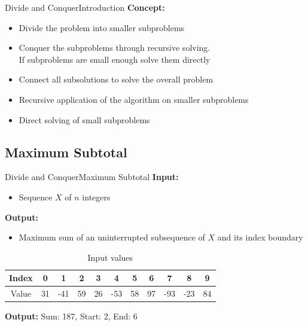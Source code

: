 


\begin{frame}{Divide and Conquer}{Introduction}
  \textbf{Concept:}
  \begin{itemize}
    \item<2->
      {\color{MainA}Divide} the problem into smaller subproblems
    \item<3->
      {\color{MainA}Conquer} the subproblems through recursive solving.\\
      If subproblems are small enough solve them directly
    \item<4->
      {\color{MainA}Connect} all subsolutions to solve the overall problem
    \item<5->
      {\color{MainA}Recursive} application of the algorithm on smaller
      subproblems
    \item<6->
      {\color{MainA}Direct} solving of small subproblems
  \end{itemize}
\end{frame}


\subsection{Maximum Subtotal}

\begin{frame}{Divide and Conquer}{Maximum Subtotal}
  \textbf{Input:}
  \begin{itemize}
    \item<2->
      Sequence {\color{MainA}$X$} of {\color{MainA}$n$} integers
  \end{itemize}
  \textbf{Output:}
  \begin{itemize}
    \item<3->
      Maximum sum of an uninterrupted subsequence of
      {\color{MainA}$X$} and its index boundary
  \end{itemize}
  \vspace{-1em}
  \begin{table}[!t]
    \caption{Input values}
    \begin{tabular}{c|c|c|c|c|c|c|c|c|c|c}
      Index & 0 & 1 & 2 & 3 & 4 & 5 & 6 & 7 & 8 & 9\\
      \midrule
      Value & 31 & -41 & 59 & 26 & -53 & 58 & 97 & -93 & -23 & 84
    \end{tabular}
    \label{tab:divide_and_conquer:max_subtotal_example_values}
  \end{table}
  \vspace{1em}
  \textbf{Output:} Sum: 187, Start: 2, End: 6
\end{frame}

